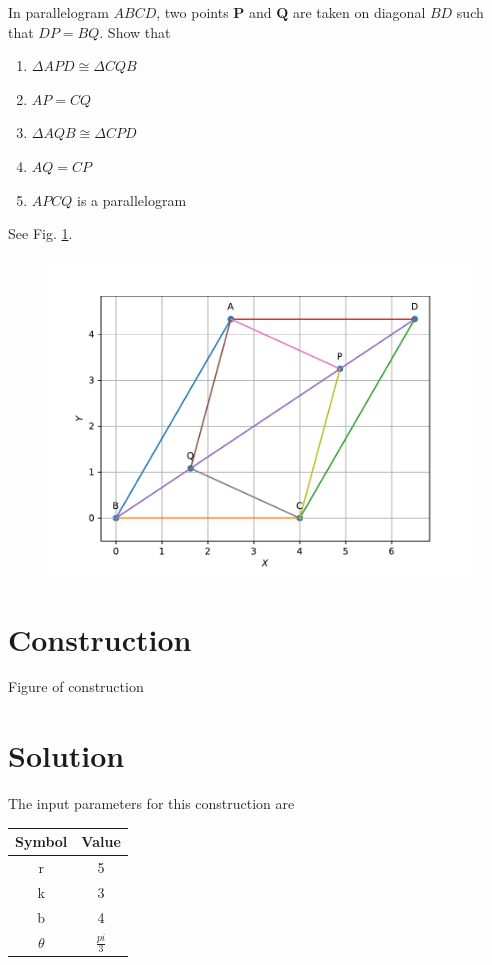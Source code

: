 \documentclass[10pt, a4paper]{article}
\title{\mytitle}
\author{\myauthor\hspace{1em}\\\contact\\FWC22011\hspace{6.5em}IITH\hspace{0.5em}\mymodule\hspace{6em}Matrix:Line}
\date{}
\let\vec\mathbf
\begin{document}
	\maketitle
	\tableofcontents
	\fi

In parallelogram $ABCD$, two points $\vec{P}$ and $\vec{Q}$ are
taken on diagonal $BD$ such that $DP = BQ$. Show that 
\begin{enumerate}
	\item  $\Delta APD \cong \Delta CQB$         
	\item  $AP = CQ$
	\item $\Delta AQB \cong \Delta CPD$     
	\item  $AQ = CP$   
	\item  $APCQ$ is a parallelogram 
\end{enumerate}
\solution 
See Fig. 
		\ref{fig:9/8/1/9}.
 	\begin{figure}
		\centering
 \includegraphics[width=\columnwidth]{chapters/9/8/1/9/figs/output.pdf}
		\caption{}
		\label{fig:9/8/1/9}
  	\end{figure}

\iffalse

\section{Construction}
  	\begin{center}
  Figure of construction
  	\end{center}

   
  \section{Solution}
\begin{center}
The input parameters for this construction are
\begin{tabular}{|c|c|}
	\hline
	\textbf{Symbol}&\textbf{Value}\\
	\hline
	r&5\\
	\hline
	k&3\\
	\hline
    b&4\\
	\hline
	$\theta$&$\frac{pi}{3}$\\
	\hline
\end{tabular}
\end{center}
\end{document}
